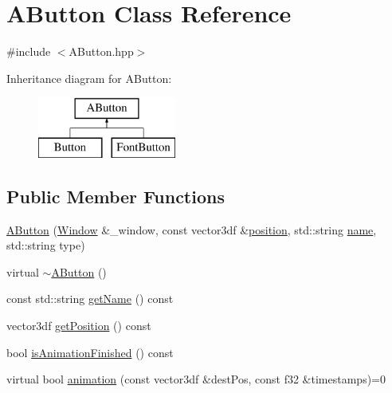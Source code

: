\hypertarget{class_a_button}{}\section{A\+Button Class Reference}
\label{class_a_button}


{\ttfamily \#include $<$A\+Button.\+hpp$>$}

Inheritance diagram for A\+Button\+:\begin{figure}[H]
\begin{center}
\leavevmode
\includegraphics[height=2.000000cm]{class_a_button}
\end{center}
\end{figure}
\subsection*{Public Member Functions}
\begin{DoxyCompactItemize}
\item 
\mbox{\hyperlink{class_a_button_a6882412288f95e71e2d3eaaac18dacfb}{A\+Button}} (\mbox{\hyperlink{class_window}{Window}} \&\+\_\+window, const vector3df \&\mbox{\hyperlink{class_a_button_a71db15822a0eeb093a07e2ac7ff76cd8}{position}}, std\+::string \mbox{\hyperlink{class_a_button_aad1d2351e9dc41d747726be929fdb459}{name}}, std\+::string type)
\item 
virtual \mbox{\hyperlink{class_a_button_ade4e33830c20aee1b587d56a01689de5}{$\sim$\+A\+Button}} ()
\item 
const std\+::string \mbox{\hyperlink{class_a_button_a3c6b399f37adccb376c2a22d3448be1a}{get\+Name}} () const
\item 
vector3df \mbox{\hyperlink{class_a_button_a268ae43108368ac706654f306da2ef15}{get\+Position}} () const
\item 
bool \mbox{\hyperlink{class_a_button_a62ececbb41f1aa6807f5d5ed5dcf59a1}{is\+Animation\+Finished}} () const
\item 
virtual bool \mbox{\hyperlink{class_a_button_a6ceaa1f1062009f1206fad570d07afbc}{animation}} (const vector3df \&dest\+Pos, const f32 \&timestamps)=0
\end{DoxyCompactItemize}

